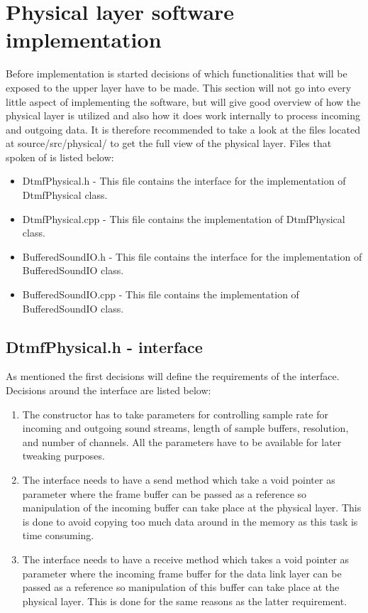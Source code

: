 \section{Physical layer software implementation}
Before implementation is started decisions of which functionalities that will be exposed to the upper layer have to be made. This section will not go into every little aspect of implementing the software, but will give good overview of how the physical layer is utilized and also how it does work internally to process incoming and outgoing data. It is therefore recommended to take a look at the files located at source/src/physical/ to get the full view of the physical layer. Files that spoken of is listed below:

\begin {itemize}
\item DtmfPhysical.h - This file contains the interface for the implementation of DtmfPhysical class.
\item DtmfPhysical.cpp - This file contains the implementation of DtmfPhysical class.
\item BufferedSoundIO.h - This file contains the interface for the implementation of BufferedSoundIO class.
\item BufferedSoundIO.cpp - This file contains the implementation of BufferedSoundIO class.
\end{itemize}

	\subsection{DtmfPhysical.h - interface}
	As mentioned the first decisions will define the requirements of the interface. Decisions around the interface are listed below:
	\begin {enumerate}
	\item The constructor has to take parameters for controlling sample rate for incoming and outgoing sound streams, length of sample buffers,
	resolution, and number of channels. All the parameters have to be available for later tweaking purposes.
	\item The interface needs to have a send method which take a void pointer as parameter where the frame buffer can be passed as a reference
	so manipulation of the incoming buffer can take place at the physical layer. This is done to avoid copying too much data around in the memory as this task is time consuming.
	\item The interface needs to have a receive method which takes a void pointer as parameter where the incoming frame buffer for the data link
	layer can be passed as a reference so manipulation of this buffer can take place at the physical layer. This is done for the same reasons as the latter requirement.
	\end{enumerate}
	

